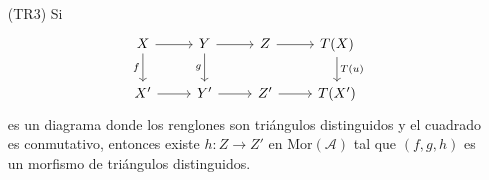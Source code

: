 \documentclass[tesis]{subfiles}
\begin{document}
\begin{Def}
\begin{itemize}
        \item[(TR3)] Si
            \begin{equation}\label{eq: (TR3)}
                \begin{tikzcd}
                    X \arrow[]{d}[swap]{f} \arrow[]{r}[]{} &Y \arrow[]{d}[swap]{g} \arrow[]{r}[]{} &Z \arrow[]{r}[]{} &T(X) \arrow[]{d}[]{T(u)} \\
                    X' \arrow[]{r}[]{} &Y' \arrow[]{r}[]{} &Z' \arrow[]{r}[]{} &T(X')
                \end{tikzcd}
            \end{equation}
            es un diagrama donde los renglones son triángulos distinguidos y el cuadrado es conmutativo, entonces existe $h:Z\to Z'$ en $\text{Mor}(\mathscr{A})$ tal que $(f,g,h)$ es un morfismo de triángulos distinguidos.



\end{itemize}
\end{Def}
\end{document}
